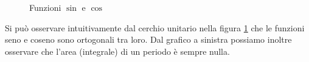 \begin{figure}[H]

    \caption{Funzioni \(\sin\) e \(\cos\) \label{fig:sin-cos-orth-plot}}
\end{figure}

Si pu\`o osservare intuitivamente dal cerchio unitario nella figura
\ref{fig:sin-cos-orth-plot} che le funzioni seno e coseno sono ortogonali tra
loro. Dal grafico a sinistra possiamo inoltre osservare che l'area (integrale)
di un periodo \`e sempre nulla.


